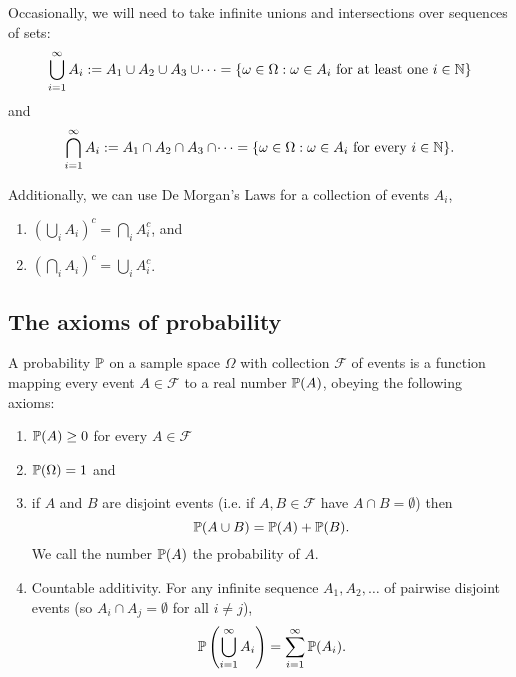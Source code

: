\documentclass[10pt, a4paper]{article}
\begin{document}
Occasionally, we will need to take infinite unions and intersections over sequences of sets:
\[
\bigcup_{i = 1}^{\infty}{A_i} := A_1 \cup A_2 \cup A_3 \cup \dotsi = \{\omega \in \Omega : \omega \in A_i \text{ for at least one } i \in \N\}
\]
and
\[
\bigcap_{i = 1}^{\infty}{A_i} := A_1 \cap A_2 \cap A_3 \cap \dotsi = \{\omega \in \Omega : \omega \in A_i \text{ for every } i \in \N\}.
\]

Additionally, we can use De Morgan's Laws for a collection of events $A_i$,
\begin{enumerate}[label = (\alph*)]
    \item $\left(\bigcup_i A_i\right) ^ c = \bigcap_i A_i ^ c$, and
    \item $\left(\bigcap_i A_i\right) ^ c = \bigcup_i A_i ^ c$.
\end{enumerate}

\subsection{The axioms of probability}

\begin{definition}[Probability]
    A probability $\P$ on a sample space $\Omega$ with collection $\mathcal{F}$ of events is a function mapping every event $A \in \mathcal{F}$ to a real number $\P(A)$, obeying the following axioms:
    \begin{enumerate}[label = A\arabic*]
        \item $\P(A) \geq 0$ for every $A \in \mathcal{F}$
        \item $\P(\Omega) = 1$ and
        \item if $A$ and $B$ are disjoint events (i.e. if $A, B \in \mathcal{F}$ have $A \cap B = \emptyset$) then
        \[
        \P(A \cup B) = \P(A) + \P(B).
        \]
        We call the number $\P(A)$ the probability of $A$.
        \item Countable additivity. For any infinite sequence $A_1, A_2, \dots$ of pairwise disjoint events (so $A_i \cap A_j = \emptyset$ for all $i \neq j$),
        \[
        \P\left(\bigcup_{i = 1}^{\infty}A_i\right) = \sum_{i = 1}^{\infty}\P(A_i).
        \]
    \end{enumerate}
\end{definition}
\end{document}
